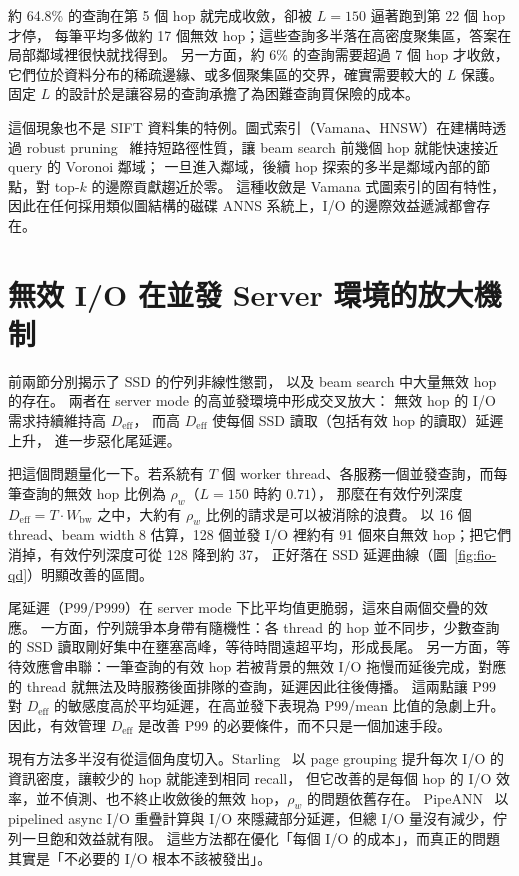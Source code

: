 約 64.8\% 的查詢在第 5 個 hop 就完成收斂，卻被 $L=150$ 逼著跑到第 22 個 hop 才停，
每筆平均多做約 17 個無效 hop；這些查詢多半落在高密度聚集區，答案在局部鄰域裡很快就找得到。
另一方面，約 6\% 的查詢需要超過 7 個 hop 才收斂，它們位於資料分布的稀疏邊緣、或多個聚集區的交界，確實需要較大的 $L$ 保護。
固定 $L$ 的設計於是讓容易的查詢承擔了為困難查詢買保險的成本。

這個現象也不是 SIFT 資料集的特例。圖式索引（Vamana、HNSW）在建構時透過 robust pruning~\cite{subramanya2019diskann}
維持短路徑性質，讓 beam search 前幾個 hop 就能快速接近 query 的 Voronoi 鄰域；
一旦進入鄰域，後續 hop 探索的多半是鄰域內部的節點，對 top-$k$ 的邊際貢獻趨近於零。
這種收斂是 Vamana 式圖索引的固有特性，因此在任何採用類似圖結構的磁碟 ANNS 系統上，I/O 的邊際效益遞減都會存在。

\section{無效 I/O 在並發 Server 環境的放大機制}
\label{sec:mot-tail}

前兩節分別揭示了 SSD 的佇列非線性懲罰，
以及 beam search 中大量無效 hop 的存在。
兩者在 server mode 的高並發環境中形成交叉放大：
無效 hop 的 I/O 需求持續維持高 $D_\text{eff}$，
而高 $D_\text{eff}$ 使每個 SSD 讀取（包括有效 hop 的讀取）延遲上升，
進一步惡化尾延遲。

把這個問題量化一下。若系統有 $T$ 個 worker thread、各服務一個並發查詢，而每筆查詢的無效 hop 比例為 $\rho_w$（$L=150$ 時約 $0.71$），
那麼在有效佇列深度 $D_\text{eff} = T \cdot W_\text{bw}$ 之中，大約有 $\rho_w$ 比例的請求是可以被消除的浪費。
以 16 個 thread、beam width 8 估算，128 個並發 I/O 裡約有 91 個來自無效 hop；把它們消掉，有效佇列深度可從 128 降到約 37，
正好落在 SSD 延遲曲線（圖~\ref{fig:fio-qd}）明顯改善的區間。

尾延遲（P99/P999）在 server mode 下比平均值更脆弱，這來自兩個交疊的效應。
一方面，佇列競爭本身帶有隨機性：各 thread 的 hop 並不同步，少數查詢的 SSD 讀取剛好集中在壅塞高峰，等待時間遠超平均，形成長尾。
另一方面，等待效應會串聯：一筆查詢的有效 hop 若被背景的無效 I/O 拖慢而延後完成，對應的 thread 就無法及時服務後面排隊的查詢，延遲因此往後傳播。
這兩點讓 P99 對 $D_\text{eff}$ 的敏感度高於平均延遲，在高並發下表現為 P99/mean 比值的急劇上升。
因此，有效管理 $D_\text{eff}$ 是改善 P99 的必要條件，而不只是一個加速手段。

現有方法多半沒有從這個角度切入。Starling~\cite{wang2024starling} 以 page grouping 提升每次 I/O 的資訊密度，讓較少的 hop 就能達到相同 recall，
但它改善的是每個 hop 的 I/O 效率，並不偵測、也不終止收斂後的無效 hop，$\rho_w$ 的問題依舊存在。
PipeANN~\cite{osdi25pipeann} 以 pipelined async I/O 重疊計算與 I/O 來隱藏部分延遲，但總 I/O 量沒有減少，佇列一旦飽和效益就有限。
這些方法都在優化「每個 I/O 的成本」，而真正的問題其實是「不必要的 I/O 根本不該被發出」。

